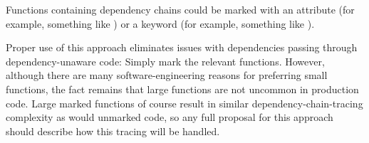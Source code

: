 Functions containing dependency chains could be marked with
an attribute (for example, something like
) or
a keyword (for example, something like
).

Proper use of this approach eliminates issues with dependencies passing
through dependency-unaware code: Simply mark the relevant functions.
However, although there are many software-engineering reasons for
preferring small functions, the fact remains that large functions
are not uncommon in production code.
Large marked functions of course result in similar dependency-chain-tracing
complexity as would unmarked code, so any full proposal for this approach
should describe how this tracing will be handled.
